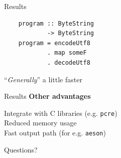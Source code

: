 \documentclass[20pt]{beamer}
\newcommand{\vspaced}{
    \vspace{5mm}
}
\begin{document}
\begin{frame}[fragile]{Results}
    \begin{lstlisting}
    program :: ByteString
            -> ByteString
    program = encodeUtf8
            . map someF
            . decodeUtf8
    \end{lstlisting}
    \vspaced
    ``\textit{Generally}'' a little faster
\end{frame}

\begin{frame}{Results}
    \textbf{Other advantages} \\
    \vspaced
    Integrate with C libraries (e.g. \texttt{pcre}) \\
    Reduced memory usage \\
    Fast output path (for e.g. \texttt{aeson}) \\
\end{frame}

\begin{frame}[plain]
    \begin{center}
    \huge{Questions?}
    \end{center}
\end{frame}
\end{document}
